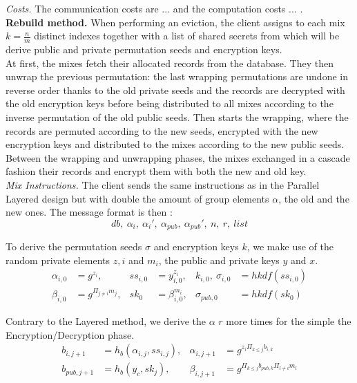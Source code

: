 \documentclass[USenglish,oneside,twocolumn]{article}
\begin{document}
\noindent\textit{Costs.} The communication costs are ... and the computation costs ... .\\

\noindent\textbf{Rebuild method.}
When performing an eviction, the client assigns to each mix  $k=\frac{n}{m}$ distinct indexes together with a list of shared secrets from which will be derive public and private permutation seeds and encryption keys.\\
At first, the mixes fetch their allocated records from the database. They then unwrap the previous permutation: the last wrapping permutations are undone in reverse order thanks to the old private seeds and the records are decrypted with the old encryption keys before being distributed to all mixes according to the inverse permutation of the old public seeds. Then starts the wrapping, where the records are permuted according to the new seeds, encrypted with the new encryption keys and distributed to the mixes according to the new public seeds. Between the wrapping and unwrapping phases, the mixes exchanged in a cascade fashion their records and encrypt them with both the new and old key.\\

\noindent\textit{Mix Instructions.}
The client sends the same instructions as in the Parallel Layered design but with double the amount of group elements $\alpha$, the old and the new ones. The message format is then : 
$$db,\  \alpha_i,\ \alpha_i',\ \alpha_{pub},\ \alpha_{pub}',\ n,\ r,\ list$$

To derive the permutation seeds $\sigma$ and encryption keys $k$, we make use of the random private elements $z,i$ and $m_i$, the public and private keys $y$ and $x$.
\begin{align*}
\alpha_{i,0} &= g^{z_i}, &ss_{i,0 }&= y_{i,0}^{z_i}, &k_{i,0},\ \sigma_{i,0}&=hkdf(ss_{i,0})\\
\beta_{i, 0} &= g^{\Pi_{j\neq i}m_j}, &sk_0 &= \beta_{i,0}^{m_i}, &\sigma_{pub, 0}&=hkdf( sk_0)
\end{align*}

Contrary to the Layered method, we derive the $\alpha$ $r$ more times for the simple the Encryption/Decryption phase. 
\begin{align*}
b_{i,j+1}&=h_b(\alpha_{i,j}, ss_{i,j}), & \alpha_{i,j+1} &= g^{z_i\Pi_{k\leq j}b_{i,k}}\\
b_{pub,j+1}&=h_b(y_c, sk_{j}), &\beta_{i, j+1} &= g^{\Pi_{k\leq j}b_{pub,k}\Pi_{l\neq i}m_l}\\
\end{align*}
\end{document}
